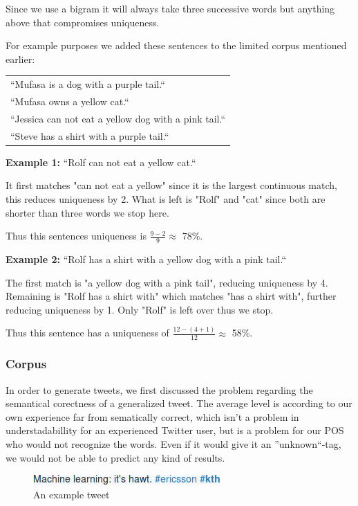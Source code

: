 \documentclass[a4paper,12pt]{article}
\begin{document}
Since we use a bigram it will always take three successive words but anything above that compromises uniqueness.

For example purposes we added these sentences to the limited corpus mentioned earlier:

\begin{tabular}{l}
``Mufasa is a dog with a purple tail.``\\
``Mufasa owns a yellow cat.``\\
``Jessica can not eat a yellow dog with a pink tail.``\\
``Steve has a shirt with a purple tail.``\\
\end{tabular}

\textbf{Example 1:} ``Rolf can not eat a yellow cat.``
	
It first matches "can not eat a yellow" since it is the largest continuous match, this reduces uniqueness by 2. What is left is "Rolf" and "cat" since both are shorter than three words we stop here.

Thus this sentences uniqueness is $\frac{9 - 2}{9} \approx$ 78\%.

\textbf{Example 2:} ``Rolf has a shirt with a yellow dog with a pink tail.``
	
The first match is "a yellow dog with a pink tail", reducing uniqueness by 4. Remaining is "Rolf has a shirt with" which matches "has a shirt with", further reducing uniqueness by 1. Only "Rolf" is left over thus we stop. 

Thus this sentence has a uniqueness of $\frac{12 - (4 + 1)}{12} \approx$ 58\%.

\subsubsection{Corpus}
In order to generate tweets, we first discussed the problem regarding the semantical corectness of a generalized tweet.
The average level is according to our own experience far from sematically correct, which isn't a problem in understadabillity for an experienced Twitter user,
but is a problem for our POS who would not recognize the words. Even if it would give it an ''unknown``-tag, we would not be able to predict any kind of results.

\begin{figure}[h!]
  \centering
  \includegraphics[width=0.75\linewidth]{machine_learning}
  \caption{An example tweet}
\end{figure}
\end{document}
